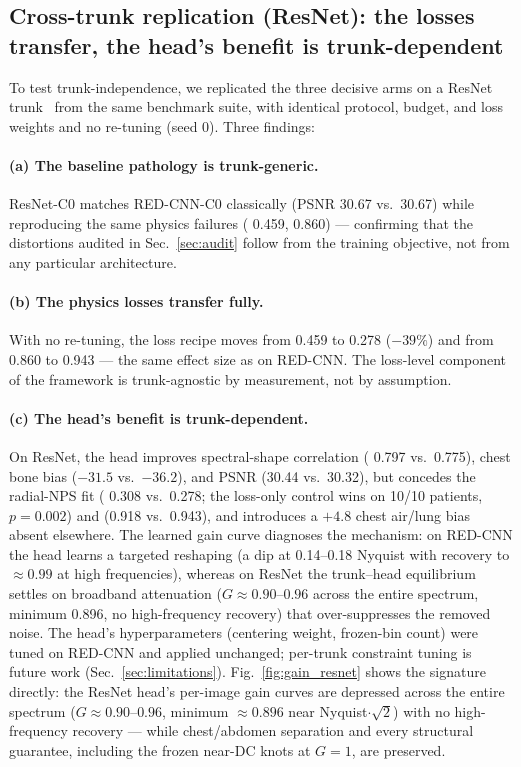 \subsection{Cross-trunk replication (ResNet): the losses transfer, the head's benefit is trunk-dependent}
\label{sec:crosstrunk}

To test trunk-independence, we replicated the three decisive arms on a ResNet trunk~\cite{he2016} from the same benchmark suite, with identical protocol, budget, and loss weights and no re-tuning (seed 0). Three findings:

\paragraph{(a) The baseline pathology is trunk-generic.}
ResNet-C0 matches RED-CNN-C0 classically (PSNR 30.67 vs.\ 30.67) while reproducing the same physics failures (\npsl{} 0.459, \stdr{} 0.860) --- confirming that the distortions audited in Sec.~\ref{sec:audit} follow from the training objective, not from any particular architecture.

\paragraph{(b) The physics losses transfer fully.}
With no re-tuning, the loss recipe moves \npsl{} from 0.459 to 0.278 ($-39\%$) and \stdr{} from 0.860 to 0.943 --- the same effect size as on RED-CNN. The loss-level component of the framework is trunk-agnostic by measurement, not by assumption.

\paragraph{(c) The head's benefit is trunk-dependent.}
On ResNet, the head improves spectral-shape correlation (\npsc{} 0.797 vs.\ 0.775), chest bone bias ($-31.5$ vs.\ $-36.2$\hu{}), and PSNR (30.44 vs.\ 30.32), but concedes the radial-NPS fit (\npsl{} 0.308 vs.\ 0.278; the loss-only control wins on 10/10 patients, $p = 0.002$) and \stdr{} (0.918 vs.\ 0.943), and introduces a $+4.8$\hu{} chest air/lung bias absent elsewhere. The learned gain curve diagnoses the mechanism: on RED-CNN the head learns a targeted reshaping (a dip at 0.14--0.18 Nyquist with recovery to ${\approx}0.99$ at high frequencies), whereas on ResNet the trunk--head equilibrium settles on broadband attenuation ($G \approx 0.90$--$0.96$ across the entire spectrum, minimum 0.896, no high-frequency recovery) that over-suppresses the removed noise. The head's hyperparameters (centering weight, frozen-bin count) were tuned on RED-CNN and applied unchanged; per-trunk constraint tuning is future work (Sec.~\ref{sec:limitations}). Fig.~\ref{fig:gain_resnet} shows the signature directly: the ResNet head's per-image gain curves are depressed across the entire spectrum ($G \approx 0.90$--$0.96$, minimum ${\approx}0.896$ near Nyquist$\cdot\sqrt{2}$) with no high-frequency recovery --- while chest/abdomen separation and every structural guarantee, including the frozen near-DC knots at $G = 1$, are preserved.

